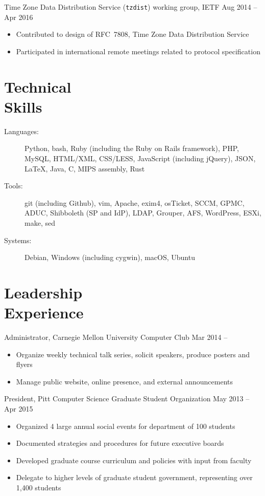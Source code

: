 \documentclass[11pt]{article}
\newcommand{\textdb}[1]{\fontseries{db}\selectfont#1\normalfont}
\newcommand{\present}{\phantom{Xxx 20XX}}
\newcommand{\itemizeonly}{\leavevmode\par\vspace{\dimexpr-\baselineskip-\parskip}}
\begin{document}
\textdb{
Time Zone Data Distribution Service (\texttt{tzdist}) working group, IETF
	\hfill Aug 2014 -- Apr 2016
}
\begin{itemize}
	\item Contributed to design of RFC~7808, Time Zone Data Distribution Service
	\item Participated in international remote meetings related to protocol specification
\end{itemize}



\section{Technical\\ Skills}

\itemizeonly
\begin{description}
	\item[\textdb{Languages:}] Python, bash, Ruby (including the Ruby on Rails framework), PHP, MySQL,
		HTML/XML, CSS/LESS, JavaScript (including jQuery), JSON,
		\LaTeX, Java, C, MIPS assembly, Rust
	\item[\textdb{Tools:}] git (including Github), vim, Apache, exim4, osTicket,
		SCCM, GPMC, ADUC, Shibboleth (SP and IdP),
		LDAP, Grouper, AFS, WordPress, ESXi, make, sed
	\item[\textdb{Systems:}] Debian, Windows (including cygwin), macOS, Ubuntu
\end{description}



\section{Leadership\\ Experience}

\textdb{
Administrator, Carnegie Mellon University Computer Club
	\hfill Mar 2014 -- \present
}
\begin{itemize}
	\item Organize weekly technical talk series, solicit speakers, produce posters and flyers
	\item Manage public website, online presence, and external announcements
\end{itemize}

\textdb{
President, Pitt Computer Science Graduate Student Organization
	\hfill May 2013 -- Apr 2015
}
\begin{itemize}
	\item Organized 4 large annual social events for department of 100 students
	\item Documented strategies and procedures for future executive boards
	\item Developed graduate course curriculum and policies with input from faculty
	\item Delegate to higher levels of graduate student government,
		representing over 1,400 students
\end{itemize}
\end{document}
